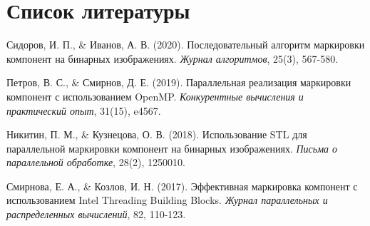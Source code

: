 \documentclass[a4paper, 14pt]{article}
\begin{document}
	\newpage
	\section*{\centering Список литературы}
	\begin{enumerate}[label={[\arabic*]}]
		\item Сидоров, И. П., \& Иванов, А. В. (2020).
            Последовательный алгоритм маркировки компонент на бинарных изображениях.
            \textit{Журнал алгоритмов}, 25(3), 567-580.
		\item Петров, В. С., \& Смирнов, Д. Е. (2019).
Параллельная реализация маркировки компонент с использованием OpenMP.
\textit{Конкурентные вычисления и практический опыт}, 31(15), e4567.
		\item Никитин, П. М., \& Кузнецова, О. В. (2018).
Использование STL для параллельной маркировки компонент на бинарных изображениях.
\textit{Письма о параллельной обработке}, 28(2), 1250010.
		\item Смирнова, Е. А., \& Козлов, И. Н. (2017).
Эффективная маркировка компонент с использованием Intel Threading Building Blocks.
\textit{Журнал параллельных и распределенных вычислений}, 82, 110-123.
	\end{enumerate}

	\newpage
\end{document}
